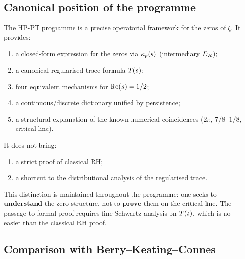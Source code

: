 \subsection{Canonical position of the programme}
\label{sec:position_canonique}

The HP-PT programme is a precise operatorial framework for the
zeros of $\zeta$. It provides:
\begin{enumerate}[nosep,leftmargin=*]
\item a closed-form expression for the zeros via $\kappa_p(s)$
(intermediary $D_R$);
\item a canonical regularised trace formula $T(s)$;
\item four equivalent mechanisms for $\operatorname{Re}(s) = 1/2$;
\item a continuous/discrete dictionary unified by persistence;
\item a structural explanation of the known numerical coincidences
($2\pi$, $7/8$, $1/8$, critical line).
\end{enumerate}

It does not bring:
\begin{enumerate}[nosep,leftmargin=*]
\item a strict proof of classical RH;
\item a shortcut to the distributional analysis of the regularised
trace.
\end{enumerate}

This distinction is maintained throughout the programme: one seeks
to \textbf{understand} the zero structure, not to \textbf{prove}
them on the critical line. The passage to formal proof requires
fine Schwartz analysis on $T(s)$, which is no easier than the
classical RH proof.

\subsection{Comparison with Berry--Keating--Connes}
\label{sec:comparaison_BKC}

